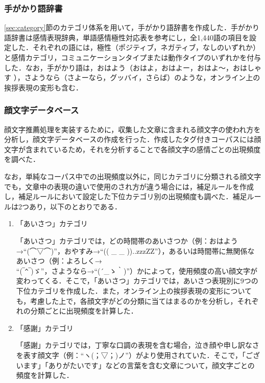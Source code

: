 \documentclass[japanese]{jnlp_1.4}
\begin{document}
\subsubsection*{手がかり語辞書}

\ref{sec:category}節のカテゴリ体系を用いて，手がかり語辞書を作成した．手がかり語辞書は感情表現辞典\cite{naka}，単語感情極性対応表\cite{taka}を参考にし，全1,440語の項目を設定した．それぞれの語には，極性（ポジティブ，ネガティブ，なしのいずれか）と感情カテゴリ，コミュニケーションタイプまたは動作タイプのいずれかを付与した．なお，手がかり語は，おはよう（おはよ，おはよー，おはよ〜，おはしゃす
），さようなら（さよーなら，グッバイ，さらば）のような，オンライン上の挨拶表現の変形も含む．


\subsubsection*{顔文字データベース}

顔文字推薦処理を実装するために，収集した文章に含まれる顔文字の使われ方を分析し，顔文字データベースの作成を行った．作成したタグ付きコーパスには顔文字が含まれているため，それを分析することで各顔文字の感情ごとの出現頻度を調べた．

なお，単純なコーパス中での出現頻度以外に，同じカテゴリに分類される顔文字でも，文章中の表現の違いで使用のされ方が違う場合には，補足ルールを作成し，補足ルールにおいて設定した下位カテゴリ別の出現頻度も調べた．補足ルールは2つあり，以下のとおりである．

\begin{enumerate}
\item 「あいさつ」カテゴリ

「あいさつ」カテゴリでは，どの時間帯のあいさつか（例：おはよう→``(⌒▽⌒)''，おやすみ→``(( \_ \_ ))..zzzZZ''），あるいは時間帯に無関係なあいさつ（例：よろしく→\\``(‾\verb|^|‾)ゞ''，さようなら→``(´\_ゝ｀)''）かによって，使用頻度の高い顔文字が変わってくる．そこで，「あいさつ」カテゴリでは，あいさつ表現別に9つの下位カテゴリを作成した．また，オンライン上の挨拶表現の変形についても，考慮した上で，各顔文字がどの分類に当てはまるのかを分析し，それぞれの分類ごとに出現頻度を計算した．

\item 「感謝」カテゴリ

「感謝」カテゴリでは，丁寧な口調の表現を含む場合，泣き顔や申し訳なさを表す顔文字（例：``ヽ(；▽；)ノ''）がより使用されていた．そこで，「ございます」「ありがたいです」などの言葉を含む文章について，顔文字ごとの頻度を計算した．
\end{enumerate}
\end{document}
